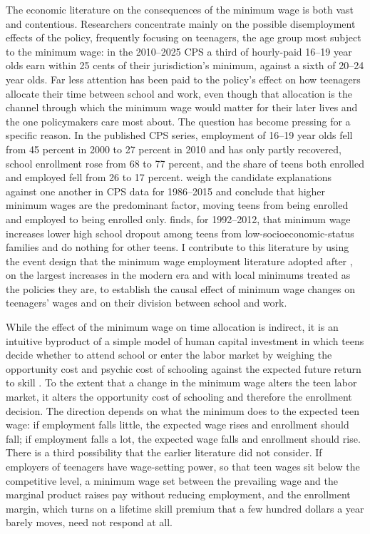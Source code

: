 \documentclass[12pt]{article}
\begin{document}
The economic literature on the consequences of the minimum wage is both vast and contentious. Researchers concentrate mainly on the possible disemployment effects of the policy, frequently focusing on teenagers, the age group most subject to the minimum wage: in the 2010--2025 CPS a third of hourly-paid 16--19 year olds earn within 25 cents of their jurisdiction's minimum, against a sixth of 20--24 year olds. Far less attention has been paid to the policy's effect on how teenagers allocate their time between school and work, even though that allocation is the channel through which the minimum wage would matter for their later lives and the one policymakers care most about. The question has become pressing for a specific reason. In the published CPS series, employment of 16--19 year olds fell from 45 percent in 2000 to 27 percent in 2010 and has only partly recovered, school enrollment rose from 68 to 77 percent, and the share of teens both enrolled and employed fell from 26 to 17 percent. \citet{neumark2019} weigh the candidate explanations against one another in CPS data for 1986--2015 and conclude that higher minimum wages are the predominant factor, moving teens from being enrolled and employed to being enrolled only. \citet{smith2021} finds, for 1992--2012, that minimum wage increases lower high school dropout among teens from low-socioeconomic-status families and do nothing for other teens. I contribute to this literature by using the event design that the minimum wage employment literature adopted after \citet{cengiz2019}, on the largest increases in the modern era and with local minimums treated as the policies they are, to establish the causal effect of minimum wage changes on teenagers' wages and on their division between school and work.

While the effect of the minimum wage on time allocation is indirect, it is an intuitive byproduct of a simple model of human capital investment in which teens decide whether to attend school or enter the labor market by weighing the opportunity cost and psychic cost of schooling against the expected future return to skill \citep{mincer1976}. To the extent that a change in the minimum wage alters the teen labor market, it alters the opportunity cost of schooling and therefore the enrollment decision. The direction depends on what the minimum does to the expected teen wage: if employment falls little, the expected wage rises and enrollment should fall; if employment falls a lot, the expected wage falls and enrollment should rise. There is a third possibility that the earlier literature did not consider. If employers of teenagers have wage-setting power, so that teen wages sit below the competitive level, a minimum wage set between the prevailing wage and the marginal product raises pay without reducing employment, and the enrollment margin, which turns on a lifetime skill premium that a few hundred dollars a year barely moves, need not respond at all.
\end{document}
